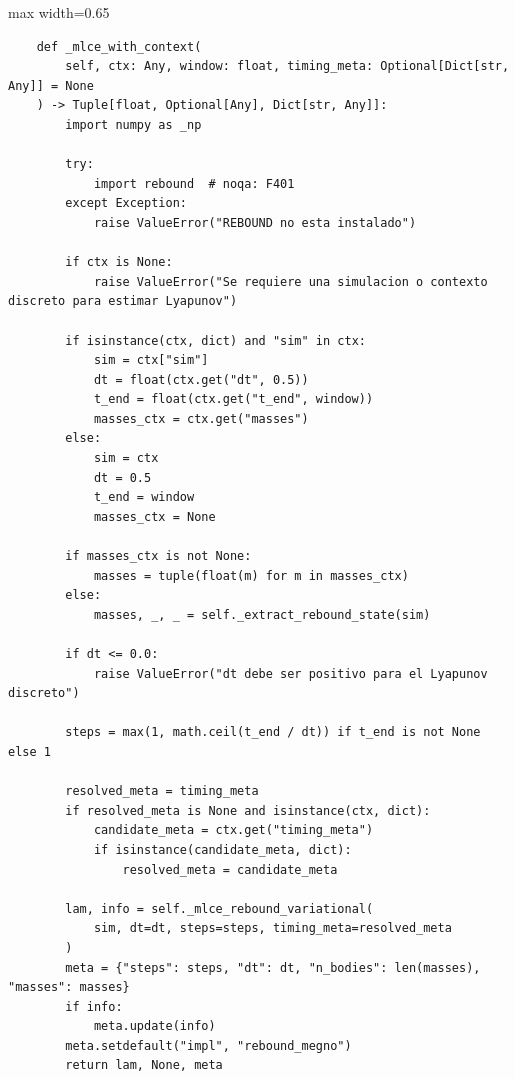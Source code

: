 \begin{listing}[H]
\caption{Bloque de código de \texttt{\_mlce\_with\_context}}
\begin{adjustbox}{max width=0.65\textwidth}
\begin{minipage}{\textwidth}
\begin{verbatim}
    def _mlce_with_context(
        self, ctx: Any, window: float, timing_meta: Optional[Dict[str, Any]] = None
    ) -> Tuple[float, Optional[Any], Dict[str, Any]]:
        import numpy as _np

        try:
            import rebound  # noqa: F401
        except Exception:
            raise ValueError("REBOUND no esta instalado")

        if ctx is None:
            raise ValueError("Se requiere una simulacion o contexto discreto para estimar Lyapunov")

        if isinstance(ctx, dict) and "sim" in ctx:
            sim = ctx["sim"]
            dt = float(ctx.get("dt", 0.5))
            t_end = float(ctx.get("t_end", window))
            masses_ctx = ctx.get("masses")
        else:
            sim = ctx
            dt = 0.5
            t_end = window
            masses_ctx = None

        if masses_ctx is not None:
            masses = tuple(float(m) for m in masses_ctx)
        else:
            masses, _, _ = self._extract_rebound_state(sim)

        if dt <= 0.0:
            raise ValueError("dt debe ser positivo para el Lyapunov discreto")

        steps = max(1, math.ceil(t_end / dt)) if t_end is not None else 1

        resolved_meta = timing_meta
        if resolved_meta is None and isinstance(ctx, dict):
            candidate_meta = ctx.get("timing_meta")
            if isinstance(candidate_meta, dict):
                resolved_meta = candidate_meta

        lam, info = self._mlce_rebound_variational(
            sim, dt=dt, steps=steps, timing_meta=resolved_meta
        )
        meta = {"steps": steps, "dt": dt, "n_bodies": len(masses), "masses": masses}
        if info:
            meta.update(info)
        meta.setdefault("impl", "rebound_megno")
        return lam, None, meta
\end{verbatim}
\end{minipage}
\end{adjustbox}
\end{listing}
\vspace{0.2cm}
